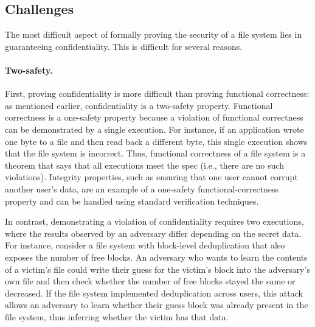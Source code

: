 



\subsection{Challenges}
\label{s:goal:chal}

The most difficult aspect of formally proving the security of a file system lies
in guaranteeing confidentiality.  This is difficult for several reasons.

\paragraph{Two-safety.}
First, proving confidentiality is more difficult than
proving functional correctness: as mentioned earlier, confidentiality
is a two-safety property.  Functional correctness is a one-safety
property because a violation of functional correctness can be demonstrated
by a single execution.  For instance, if an application wrote one byte to
a file and then read back a different byte, this single execution shows
that the file system is incorrect.  Thus, functional correctness
of a file system is a theorem that says that all executions meet the
spec (i.e., there are no such violations).  Integrity properties,
such as ensuring that one user cannot corrupt another user's data,
are an example of a one-safety functional-correctness property and can
be handled using standard verification techniques.

In contrast, demonstrating a violation of confidentiality requires
two executions, where the results observed by an adversary differ depending on
the secret data.
For instance, consider a file system with block-level deduplication that
also exposes the number of free blocks.  An adversary who wants to
learn the contents of a victim's file could write their guess for the
victim's block into the adversary's own file and then check whether
the number of free blocks stayed the same or decreased.  If the file
system implemented deduplication across users, this attack allows an
adversary to learn whether their guess block was already present in the
file system, thus inferring whether the victim has that data.

